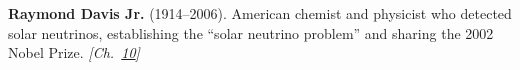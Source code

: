 \nobelphysics \textbf{Raymond Davis Jr.} (1914–2006). American chemist and physicist who detected solar neutrinos, establishing the ``solar neutrino problem'' and sharing the 2002 Nobel Prize. \emph{[Ch.~\hyperref[ch:solarfusionquantumtunneling]{10}]}

